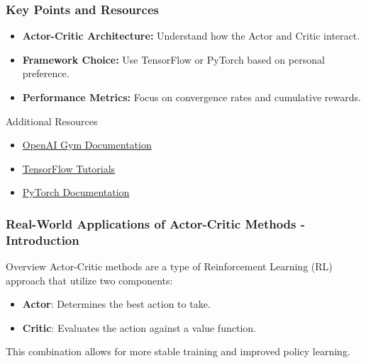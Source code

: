 \documentclass{beamer}
\begin{document}
\begin{frame}[fragile]
    \frametitle{Key Points and Resources}
    \begin{itemize}
        \item \textbf{Actor-Critic Architecture:} Understand how the Actor and Critic interact.
        \item \textbf{Framework Choice:} Use TensorFlow or PyTorch based on personal preference.
        \item \textbf{Performance Metrics:} Focus on convergence rates and cumulative rewards.
    \end{itemize}
    
    \begin{block}{Additional Resources}
        \begin{itemize}
            \item \href{https://gym.openai.com/}{OpenAI Gym Documentation}
            \item \href{https://www.tensorflow.org/tutorials/}{TensorFlow Tutorials}
            \item \href{https://pytorch.org/tutorials/}{PyTorch Documentation}
        \end{itemize}
    \end{block}
\end{frame}

\begin{frame}[fragile]
    \frametitle{Real-World Applications of Actor-Critic Methods - Introduction}
    \begin{block}{Overview}
        Actor-Critic methods are a type of Reinforcement Learning (RL) approach that utilize two components:
        \begin{itemize}
            \item \textbf{Actor}: Determines the best action to take.
            \item \textbf{Critic}: Evaluates the action against a value function.
        \end{itemize}
        This combination allows for more stable training and improved policy learning.
    \end{block}
\end{frame}
\end{document}
